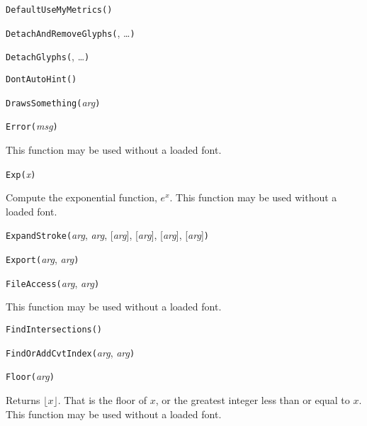 \noindent\texttt{DefaultUseMyMetrics(}\texttt{)}


\noindent\texttt{DetachAndRemoveGlyphs(}, \ldots\texttt{)}


\noindent\texttt{DetachGlyphs(}, \ldots\texttt{)}


\noindent\texttt{DontAutoHint(}\texttt{)}


\noindent\texttt{DrawsSomething(}\textit{arg}\texttt{)}


\noindent\texttt{Error(}\textit{msg}\texttt{)}

This function may be used without a loaded font.


\noindent\texttt{Exp(}\textit{x}\texttt{)}

Compute the exponential function, $e^x$.
This function may be used without a loaded font.


\noindent\texttt{ExpandStroke(}\textit{arg}, \textit{arg}, [\textit{arg}], [\textit{arg}], [\textit{arg}], [\textit{arg}]\texttt{)}


\noindent\texttt{Export(}\textit{arg}, \textit{arg}\texttt{)}


\noindent\texttt{FileAccess(}\textit{arg}, \textit{arg}\texttt{)}

This function may be used without a loaded font.


\noindent\texttt{FindIntersections(}\texttt{)}


\noindent\texttt{FindOrAddCvtIndex(}\textit{arg}, \textit{arg}\texttt{)}


\noindent\texttt{Floor(}\textit{arg}\texttt{)}

Returns $\lfloor x \rfloor$.  That is the floor of $x$, or the greatest
integer less than or equal to $x$.  This function may be used without a
loaded font.


